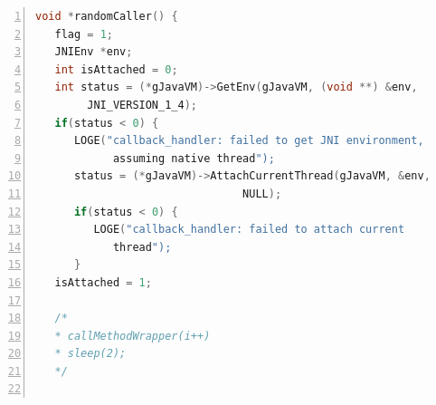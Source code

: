 \documentclass[a4paper,10pt]{article}
\begin{document}
\begin{multicols}{2}
\begin{lstlisting}[language=C,
				   columns=fullflexible,
				   showstringspaces=false,
				   xleftmargin=15pt,
				   frame = l,
				   numbers=left,
				   commentstyle=\color{gray}\upshape,
				   caption=Part of tutorial2.c - thread attachment in randomCaller(),
				   label=lst:tut2-c3]
void *randomCaller() {
   flag = 1;
   JNIEnv *env;
   int isAttached = 0;				   
   int status = (*gJavaVM)->GetEnv(gJavaVM, (void **) &env,
		JNI_VERSION_1_4);
   if(status < 0) {
      LOGE("callback_handler: failed to get JNI environment,
      		assuming native thread");
      status = (*gJavaVM)->AttachCurrentThread(gJavaVM, &env,
      							NULL);
      if(status < 0) {
         LOGE("callback_handler: failed to attach current
         	thread");
      }
   isAttached = 1;

   /*
   * callMethodWrapper(i++) 
   * sleep(2);   
   */
   

\end{lstlisting}
\end{multicols}
\end{document}
